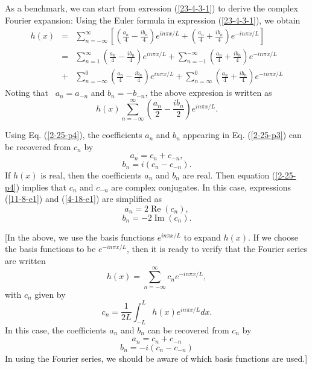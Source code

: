 \documentclass{article}
\newcommand{\tmop}[1]{\ensuremath{\operatorname{#1}}}
\begin{document}
{As a benchmark, we can start from exression (\ref{23-4-3-1}) to derive the
complex Fourier expansion: Using the Euler formula in expression
(\ref{23-4-3-1}), we obtain
\begin{eqnarray*}
  h (x) & = & \sum_{n = - \infty}^{\infty} \left[ \left( \frac{a_n}{4} -
  \frac{i b_n}{4} \right) e^{i n \pi x / L} + \left( \frac{a_n}{4} + \frac{i
  b_n}{4} \right) e^{- i n \pi x / L} \right]\\
  & = & \sum_{n = 1}^{\infty} \left( \frac{a_n}{4} - \frac{i b_n}{4} \right)
  e^{i n \pi x / L} + \sum_{n = - 1}^{- \infty} \left( \frac{a_n}{4} + \frac{i
  b_n}{4} \right) e^{- i n \pi x / L}\\
  & + & \sum_{n = - \infty}^0 \left( \frac{a_n}{4} - \frac{i b_n}{4} \right)
  e^{i n \pi x / L} + \sum_{n = \infty}^0 \left( \frac{a_n}{4} + \frac{i
  b_n}{4} \right) e^{- i n \pi x / L}
\end{eqnarray*}
Noting that \ $a_n = a_{- n}$ and $b_n = - b_{- n}$, the above expresion is
written as
\[ h (x) \sum_{n = - \infty}^{\infty} \left( \frac{a_n}{2} - \frac{i b_n}{2}
   \right) e^{i n \pi x / L} . \]}

Using Eq. (\ref{2-25-p4}), the coefficients $a_n$ and $b_n$ appearing in Eq.
(\ref{2-25-p3}) can be recovered from $c_n$ by
\begin{equation}
  \label{11-8-e1} a_n = c_n + c_{- n},
\end{equation}
\begin{equation}
  \label{4-18-e1} b_n = i (c_n - c_{- n}) .
\end{equation}
If $h (x)$ is real, then the coefficients $a_n$ and $b_n$ are real. Then
equation (\ref{2-25-p4}) implies that $c_n$ and $c_{- n}$ are complex
conjugates. In this case, expressions (\ref{11-8-e1}) and (\ref{4-18-e1}) are
simplified as
\begin{equation}
  a_n = 2 \tmop{Re} (c_n),
\end{equation}
\begin{equation}
  b_n = - 2 \tmop{Im} (c_n) .
\end{equation}


[In the above, we use the basis functions $e^{i n \pi x / L}$ to expand $h
(x)$. If we choose the basis functions to be $e^{- i n \pi x / L}$, then it is
ready to verify that the Fourier series are written
\begin{equation}
  h (x) = \sum_{n = - \infty}^{\infty} c_n e^{- i n \pi x / L},
\end{equation}
with $c_n$ given by
\begin{equation}
  \label{19-1-10-1} c_n = \frac{1}{2 L} \int_{- L}^L h (x) e^{i n \pi x / L} d
  x.
\end{equation}
In this case, the coefficients $a_n$ and $b_n$ can be recovered from $c_n$ by
\begin{equation}
  \label{18-2-2p1} a_n = c_n + c_{- n}
\end{equation}
\begin{equation}
  \label{18-2-2p2} b_n = - i (c_n - c_{- n})
\end{equation}
In using the Fourier series, we should be aware of which basis functions are
used.]
\end{document}
